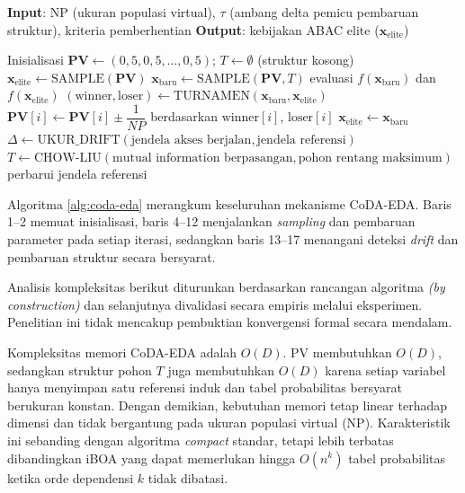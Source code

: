 \begin{algorithm}[htbp]
\caption{CoDA-EDA (Compact Dependency-Aware EDA)}
\label{alg:coda-eda}
\begin{algorithmic}[1]
\Statex \textbf{Input}: NP (ukuran populasi virtual), $\tau$ (ambang delta pemicu pembaruan struktur), kriteria pemberhentian
\Statex \textbf{Output}: kebijakan ABAC elite ($\mathbf{x}_{\text{elite}}$)

\State Inisialisasi $\mathbf{PV} \leftarrow (0{,}5, 0{,}5, \ldots, 0{,}5)$; $T \leftarrow \emptyset$\label{first:symbol-empty} (struktur kosong)
\State $\mathbf{x}_{\text{elite}} \leftarrow \text{SAMPLE}(\mathbf{PV})$
    \State $\mathbf{x}_{\text{baru}} \leftarrow \text{SAMPLE}(\mathbf{PV}, T)$ 
    \State evaluasi $f(\mathbf{x}_{\text{baru}})$ dan $f(\mathbf{x}_{\text{elite}})$
    \State $(\text{winner}, \text{loser}) \leftarrow \text{TURNAMEN}(\mathbf{x}_{\text{baru}}, \mathbf{x}_{\text{elite}})$
        \State $\mathbf{PV}[i] \leftarrow \mathbf{PV}[i] \pm \dfrac{1}{NP}$ berdasarkan $\text{winner}[i]$, $\text{loser}[i]$
    \EndFor
        \State $\mathbf{x}_{\text{elite}} \leftarrow \mathbf{x}_{\text{baru}}$
    \EndIf
    \State $\Delta \leftarrow \text{UKUR\_DRIFT}(\text{jendela akses berjalan}, \text{jendela referensi})$
    \If{$\Delta > \tau$}
        \State $T \leftarrow \text{CHOW-LIU}(\text{mutual information berpasangan}, \text{pohon rentang maksimum})$
        \State perbarui jendela referensi
    \EndIf
\EndWhile
\State {}
\end{algorithmic}
\end{algorithm}\label{first:symbol-empty}

Algoritma \ref{alg:coda-eda} merangkum keseluruhan mekanisme CoDA-EDA. 
Baris 1–2 memuat inisialisasi, baris 4–12 menjalankan \textit{sampling} dan pembaruan parameter pada setiap iterasi, sedangkan baris 13–17 menangani deteksi \textit{drift} dan pembaruan struktur secara bersyarat.

Analisis kompleksitas berikut diturunkan berdasarkan rancangan algoritma \textit{(by construction)} dan selanjutnya divalidasi secara empiris melalui eksperimen. 
Penelitian ini tidak mencakup pembuktian konvergensi formal secara mendalam.

Kompleksitas memori CoDA-EDA adalah $O(D)$. 
PV membutuhkan $O(D)$, sedangkan struktur pohon $T$ juga membutuhkan $O(D)$ karena setiap variabel hanya menyimpan satu referensi induk dan tabel probabilitas bersyarat berukuran konstan. 
Dengan demikian, kebutuhan memori tetap linear terhadap dimensi dan tidak bergantung pada ukuran populasi virtual (NP). 
Karakteristik ini sebanding dengan algoritma \textit{compact} standar, tetapi lebih terbatas dibandingkan iBOA yang dapat memerlukan hingga $O(n^k)$ tabel probabilitas ketika orde dependensi $k$ tidak dibatasi.

